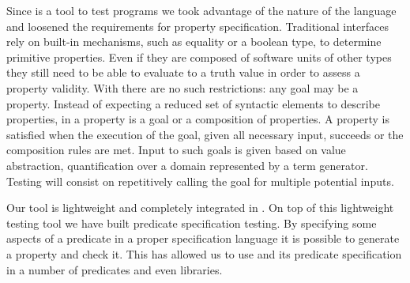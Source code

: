 Since \plqc{} is a tool to test \Prolog{} programs we took advantage of
the nature of the language and loosened the requirements for property
specification.
%
Traditional interfaces rely on built-in mechanisms, such as equality or
a boolean type, to determine primitive properties.
%
Even if they are composed of software units of other types they still
need to be able to evaluate to a truth value in order to assess a
property validity.
%
With \Prolog{} there are no such restrictions: any goal may be a property.
%
Instead of expecting a reduced set of syntactic elements to describe
properties, in \plqc{} a property is a goal or a composition of
properties.
A property is satisfied when the execution of the goal, given all
necessary input, succeeds or the composition rules are met.
%
Input to such goals is given based on \plqc{} value abstraction,
quantification over a domain represented by a term generator.
%
%
Testing will consist on repetitively calling the goal for multiple
potential inputs.




Our tool is
lightweight and completely integrated in \Prolog{}.
%
On top of this lightweight testing tool we have built predicate
specification testing.
%
By specifying some aspects of a predicate in a proper specification
language it is possible to generate a \plqc{} property and check it.
%
This has allowed us to  use \plqc{} and its predicate specification in a number of
predicates and even libraries.






